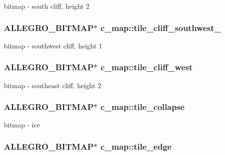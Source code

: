 bitmap -\/ south cliff, height 2 \hypertarget{classc__map_ae1b595833e6967f8d27fd5a2252d12b3}{
\subsubsection[{tile\-\_\-cliff\-\_\-southwest\-\_\-2}]{\setlength{\rightskip}{0pt plus 5cm}A\-L\-L\-E\-G\-R\-O\-\_\-\-B\-I\-T\-M\-A\-P$\ast$ c\-\_\-map\-::tile\-\_\-cliff\-\_\-southwest\-\_\hspace{0.3cm}{\ttfamily [protected]}}}\label{classc__map_ae1b595833e6967f8d27fd5a2252d12b3}
bitmap -\/ southwest cliff, height 1 \hypertarget{classc__map_aa40008668fa55a28089cd20c03563926}{
\subsubsection[{tile\-\_\-cliff\-\_\-west}]{\setlength{\rightskip}{0pt plus 5cm}A\-L\-L\-E\-G\-R\-O\-\_\-\-B\-I\-T\-M\-A\-P$\ast$ c\-\_\-map\-::tile\-\_\-cliff\-\_\-west\hspace{0.3cm}{\ttfamily [protected]}}}\label{classc__map_aa40008668fa55a28089cd20c03563926}
bitmap -\/ southeast cliff, height 2 \hypertarget{classc__map_ae13539d062f5a9eb89ebf72d7e3890be}{
\subsubsection[{tile\-\_\-collapse}]{\setlength{\rightskip}{0pt plus 5cm}A\-L\-L\-E\-G\-R\-O\-\_\-\-B\-I\-T\-M\-A\-P$\ast$ c\-\_\-map\-::tile\-\_\-collapse\hspace{0.3cm}{\ttfamily [protected]}}}\label{classc__map_ae13539d062f5a9eb89ebf72d7e3890be}
bitmap -\/ ice \hypertarget{classc__map_a0ba260cfc9fd354f0b05900b90367cfa}{
\subsubsection[{tile\-\_\-edge}]{\setlength{\rightskip}{0pt plus 5cm}A\-L\-L\-E\-G\-R\-O\-\_\-\-B\-I\-T\-M\-A\-P$\ast$ c\-\_\-map\-::tile\-\_\-edge\hspace{0.3cm}{\ttfamily [protected]}}}\label{classc__map_a0ba260cfc9fd354f0b05900b90367cfa}

